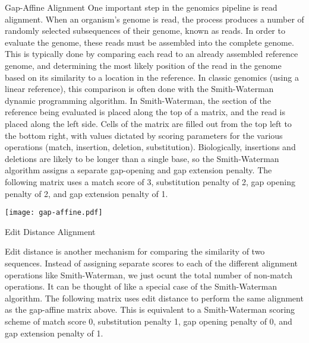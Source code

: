 \documentclass{cbxposter}
\renewcommand{\smallskip}{\vspace{0.16667in}}
\begin{document}
\begin{frame}[fragile,t]{}
\begin{columns}[T]
\begin{column}{10.5in}
\begin{block}{Gap-Affine Alignment}
  One important step in the genomics pipeline is read alignment. When an
  organism's genome is read, the process produces a number of randomly
  selected subsequences of their genome, known as reads. In order to
  evaluate the genome, these reads must be assembled into the complete
  genome. This is typically done by comparing each read to an already
  assembled reference genome, and determining the most likely position of
  the read in the genome based on its similarity to a location in the
  reference. In classic genomics (using a linear reference), this comparison
  is often done with the Smith-Waterman dynamic programming algorithm. In
  Smith-Waterman, the section of the reference being evaluated is placed
  along the top of a matrix, and the read is placed along the left side.
  Cells of the matrix are filled out from the top left to the bottom right,
  with values dictated by scoring parameters for the various operations
  (match, insertion, deletion, substitution). Biologically, insertions and
  deletions are likely to be longer than a single base, so the Smith-Waterman
  algorithm assigns a separate gap-opening and gap extension penalty. The
  following matrix uses a match score of 3, substitution penalty of 2, gap
  opening penalty of 2, and gap extension penalty of 1.

  \begin{center}
    \texttt{[image: gap-affine.pdf]}
  \end{center}

\end{block}


\vspace{0.67in}
\begin{block}{Edit Distance Alignment}
  \smallskip

  Edit distance is another mechanism for comparing the similarity of two
  sequences. Instead of assigning separate scores to each of the different
  alignment operations like Smith-Waterman, we just ocunt the total number
  of non-match operations. It can be thought of like a special case of the
  Smith-Waterman algorithm. The following matrix uses edit distance to
  perform the same alignment as the gap-affine matrix above. This is
  equivalent to a Smith-Waterman scoring scheme of match score 0,
  substitution penalty 1, gap opening penalty of 0, and gap extension
  penalty of 1.


\end{block}
\end{column}
\end{columns}
\end{frame}
\end{document}
